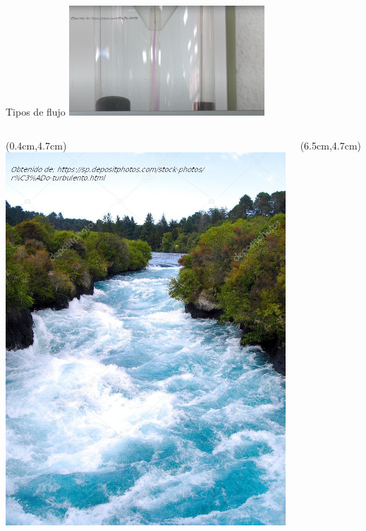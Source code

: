 \documentclass [xcolor=svgnames, t] {beamer}
\begin{document}
\begin{frame}{Tipos de flujo}
\vspace{-0.3cm}
\centering
\includegraphics[width=0.55\textwidth]{ftur2}
\begin{columns}
\begin{textblock*}{4.0cm}(0.4cm,4.7cm) %
\includegraphics[width=\textwidth]{ftur3}
\end{textblock*}
\begin{textblock*}{6cm}(6.5cm,4.7cm) %

\end{textblock*}
\end{columns}
\end{frame}
\end{document}
